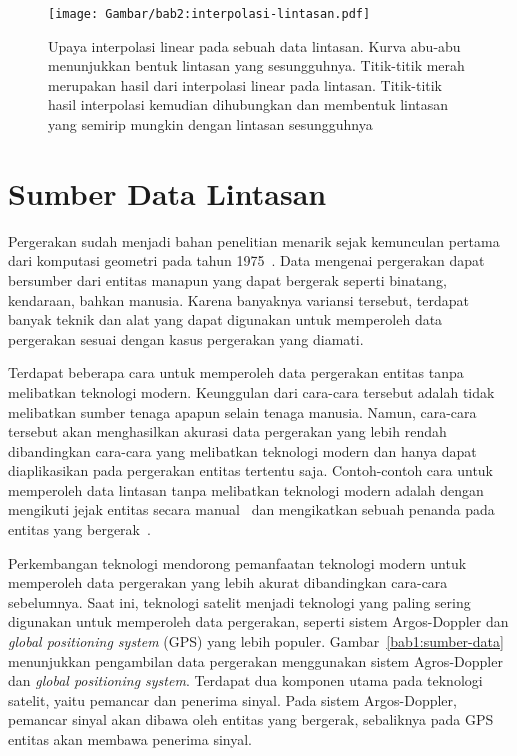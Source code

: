 \begin{figure}[h]
    \centering
    \captionsetup{width=0.7\textwidth}
    \texttt{[image: Gambar/bab2:interpolasi-lintasan.pdf]}
    \caption[Interpolasi lintasan]{Upaya interpolasi linear pada sebuah data lintasan. Kurva abu-abu menunjukkan bentuk lintasan yang sesungguhnya. Titik-titik merah merupakan hasil dari interpolasi linear pada lintasan. Titik-titik hasil interpolasi kemudian dihubungkan dan membentuk lintasan yang semirip mungkin dengan lintasan sesungguhnya}
    \label{bab2:interpolasi-lintasan}
\end{figure}

\section{Sumber Data Lintasan}
\label{sec:sumber}

Pergerakan sudah menjadi bahan penelitian menarik sejak kemunculan pertama dari komputasi geometri pada tahun 1975~\cite{shamos:02:computational-geometry}. Data mengenai pergerakan dapat bersumber dari entitas manapun yang dapat bergerak seperti binatang, kendaraan, bahkan manusia. Karena banyaknya variansi tersebut, terdapat banyak teknik dan alat yang dapat digunakan untuk memperoleh data pergerakan sesuai dengan kasus pergerakan yang diamati.

Terdapat beberapa cara untuk memperoleh data pergerakan entitas tanpa melibatkan teknologi modern. Keunggulan dari cara-cara tersebut adalah tidak melibatkan sumber tenaga apapun selain tenaga manusia. Namun, cara-cara tersebut akan menghasilkan akurasi data pergerakan yang lebih rendah dibandingkan cara-cara yang melibatkan teknologi modern dan hanya dapat diaplikasikan pada pergerakan entitas tertentu saja. Contoh-contoh cara untuk memperoleh data lintasan tanpa melibatkan teknologi modern adalah dengan mengikuti jejak entitas secara manual~\cite{stickel:02:turtle} dan mengikatkan sebuah penanda pada entitas yang bergerak~\cite{velden:02:cranes}.

Perkembangan teknologi mendorong pemanfaatan teknologi modern untuk memperoleh data pergerakan yang lebih akurat dibandingkan cara-cara sebelumnya. Saat ini, teknologi satelit menjadi teknologi yang paling sering digunakan untuk memperoleh data pergerakan, seperti sistem Argos-Doppler dan \textit{global positioning system} (GPS) yang lebih populer. Gambar~\ref{bab1:sumber-data} menunjukkan pengambilan data pergerakan menggunakan sistem Agros-Doppler dan \textit{global positioning system}. Terdapat dua komponen utama pada teknologi satelit, yaitu pemancar dan penerima sinyal. Pada sistem Argos-Doppler, pemancar sinyal akan dibawa oleh entitas yang bergerak, sebaliknya pada GPS entitas akan membawa penerima sinyal.

